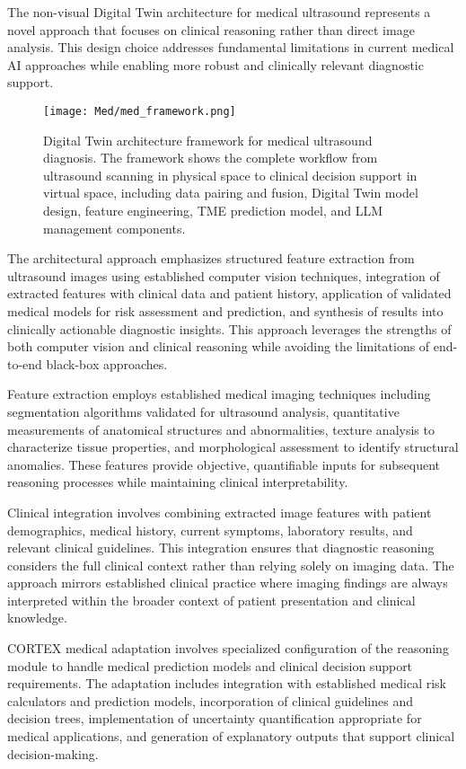 The non-visual Digital Twin architecture for medical ultrasound represents a novel approach that focuses on clinical reasoning rather than direct image analysis. This design choice addresses fundamental limitations in current medical AI approaches while enabling more robust and clinically relevant diagnostic support.

\begin{figure}[htbp]
\centering
\texttt{[image: Med/med\_framework.png]}
\caption{Digital Twin architecture framework for medical ultrasound diagnosis. The framework shows the complete workflow from ultrasound scanning in physical space to clinical decision support in virtual space, including data pairing and fusion, Digital Twin model design, feature engineering, TME prediction model, and LLM management components.}
\label{fig:med_framework}
\end{figure}

The architectural approach emphasizes structured feature extraction from ultrasound images using established computer vision techniques, integration of extracted features with clinical data and patient history, application of validated medical models for risk assessment and prediction, and synthesis of results into clinically actionable diagnostic insights. This approach leverages the strengths of both computer vision and clinical reasoning while avoiding the limitations of end-to-end black-box approaches.

Feature extraction employs established medical imaging techniques including segmentation algorithms validated for ultrasound analysis, quantitative measurements of anatomical structures and abnormalities, texture analysis to characterize tissue properties, and morphological assessment to identify structural anomalies. These features provide objective, quantifiable inputs for subsequent reasoning processes while maintaining clinical interpretability.

Clinical integration involves combining extracted image features with patient demographics, medical history, current symptoms, laboratory results, and relevant clinical guidelines. This integration ensures that diagnostic reasoning considers the full clinical context rather than relying solely on imaging data. The approach mirrors established clinical practice where imaging findings are always interpreted within the broader context of patient presentation and clinical knowledge.

CORTEX medical adaptation involves specialized configuration of the reasoning module to handle medical prediction models and clinical decision support requirements. The adaptation includes integration with established medical risk calculators and prediction models, incorporation of clinical guidelines and decision trees, implementation of uncertainty quantification appropriate for medical applications, and generation of explanatory outputs that support clinical decision-making.

